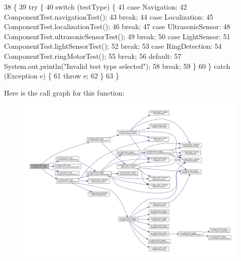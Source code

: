\begin{DoxyCode}
38                                                              \{
39     \textcolor{keywordflow}{try} \{
40       \textcolor{keywordflow}{switch} (testType) \{
41         \textcolor{keywordflow}{case} Navigation:
42           ComponentTest.navigationTest();
43           \textcolor{keywordflow}{break};
44         \textcolor{keywordflow}{case} Localization:
45           ComponentTest.localizationTest();
46           \textcolor{keywordflow}{break};
47         \textcolor{keywordflow}{case} UltrasonicSensor:
48           ComponentTest.ultrasonicSensorTest();
49           \textcolor{keywordflow}{break};
50         \textcolor{keywordflow}{case} LightSensor:
51           ComponentTest.lightSensorTest();
52           \textcolor{keywordflow}{break};
53         \textcolor{keywordflow}{case} RingDetection:
54           ComponentTest.ringMotorTest();
55           \textcolor{keywordflow}{break};
56         \textcolor{keywordflow}{default}:
57           System.out.println(\textcolor{stringliteral}{"Invalid test type selected"});
58           \textcolor{keywordflow}{break};
59       \}
60     \} \textcolor{keywordflow}{catch} (Exception e) \{
61       \textcolor{keywordflow}{throw} e;
62     \}
63   \}
\end{DoxyCode}
Here is the call graph for this function\+:
\nopagebreak
\begin{figure}[H]
\begin{center}
\leavevmode
\includegraphics[width=350pt]{enumca_1_1mcgill_1_1ecse211_1_1tests_1_1_component_test_a5dc8bf97bc48adf5bee88d425a1a974e_cgraph}
\end{center}
\end{figure}
\mbox{\label{enumca_1_1mcgill_1_1ecse211_1_1tests_1_1_component_test_ae85caa20c6391bacc4fdbd411ee3f113}} 
